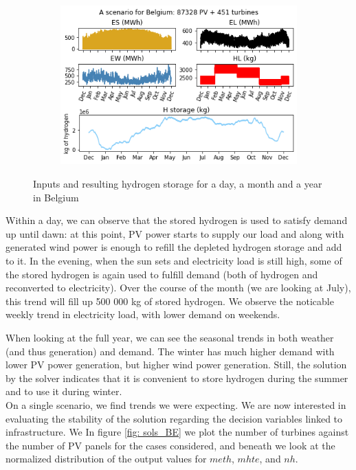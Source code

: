 \documentclass[english]{article}
\numberwithin{definition}{section}
\numberwithin{theorem}{section}
\numberwithin{problem}{section}
\begin{document}
\begin{figure}[H]
\begin{subfigure}{.30\textwidth}
\end{subfigure}
\quad
\begin{subfigure}{.30\textwidth}
  \centering
  \includegraphics[width=\linewidth]{immagini/Single_node/plot_BE_all.png}
\end{subfigure}%
\caption{Inputs and resulting hydrogen storage for a day, a month and a year in Belgium}
\label{fig: plot Belgium}
\end{figure}


Within a day, we can observe that the stored hydrogen is used to satisfy demand up until dawn: at this point, PV power starts to supply our load and along with generated wind power is enough to refill the depleted hydrogen storage and add to it. In the evening, when the sun sets and electricity load is still high, some of the stored hydrogen is again used to fulfill demand (both of hydrogen and reconverted to electricity). Over the course of the month (we are looking at July), this trend will fill up 500 000 kg of stored hydrogen. We observe the noticable weekly trend in electricity load, with lower demand on weekends. 


When looking at the full year, we can see the seasonal trends in both weather (and thus generation) and demand. The winter has much higher demand with lower PV power generation, but higher wind power generation. Still, the solution by the solver indicates that it is convenient to store hydrogen during the summer and to use it during winter.\\


On a single scenario, we find trends we were expecting. We are now interested in evaluating the stability of the solution regarding the decision variables linked to infrastructure. We  In figure \ref{fig: sols_BE} we plot the number of turbines against the number of PV panels for the cases considered, and beneath we look at the normalized distribution of the output values for $meth$, $mhte$, and $nh$.
\end{document}
